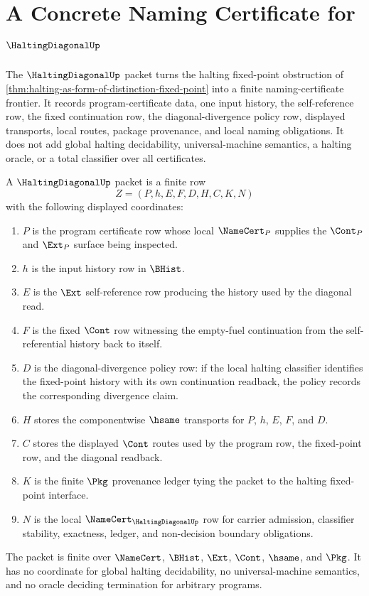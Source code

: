 \chapter{A Concrete Naming Certificate for $\HaltingDiagonalUp$}
\label{ch:concrete-instances-haltingdiagonal-namecert}

The $\HaltingDiagonalUp$ packet turns the halting fixed-point obstruction of \autoref{thm:halting-as-form-of-distinction-fixed-point} into a finite naming-certificate frontier. It records program-certificate data, one input history, the self-reference row, the fixed continuation row, the diagonal-divergence policy row, displayed transports, local routes, package provenance, and local naming obligations. It does not add global halting decidability, universal-machine semantics, a halting oracle, or a total classifier over all certificates.

\begin{definition}\label{def:halting-diagonal-packet}
A $\HaltingDiagonalUp$ packet is a finite row
$$
Z=(P,h,E,F,D,H,C,K,N)
$$
with the following displayed coordinates:
\begin{enumerate}
\item $P$ is the program certificate row whose local $\NameCert_P$ supplies the $\Cont_P$ and $\Ext_P$ surface being inspected.
\item $h$ is the input history row in $\BHist$.
\item $E$ is the $\Ext$ self-reference row producing the history used by the diagonal read.
\item $F$ is the fixed $\Cont$ row witnessing the empty-fuel continuation from the self-referential history back to itself.
\item $D$ is the diagonal-divergence policy row: if the local halting classifier identifies the fixed-point history with its own continuation readback, the policy records the corresponding divergence claim.
\item $H$ stores the componentwise $\hsame$ transports for $P$, $h$, $E$, $F$, and $D$.
\item $C$ stores the displayed $\Cont$ routes used by the program row, the fixed-point row, and the diagonal readback.
\item $K$ is the finite $\Pkg$ provenance ledger tying the packet to the halting fixed-point interface.
\item $N$ is the local $\NameCert_{\HaltingDiagonalUp}$ row for carrier admission, classifier stability, exactness, ledger, and non-decision boundary obligations.
\end{enumerate}
The packet is finite over $\NameCert$, $\BHist$, $\Ext$, $\Cont$, $\hsame$, and $\Pkg$. It has no coordinate for global halting decidability, no universal-machine semantics, and no oracle deciding termination for arbitrary programs.
\end{definition}


